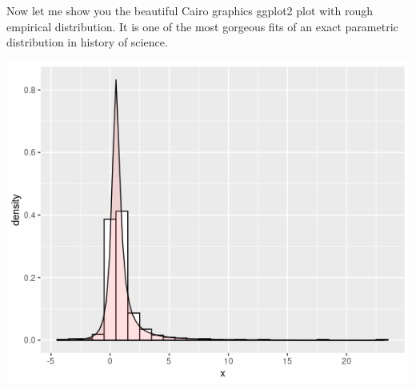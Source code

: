 \documentclass{amsart}
\begin{document}
Now let me show you the beautiful Cairo graphics ggplot2 plot with rough empirical distribution.  It is one of the most gorgeous fits of an exact parametric distribution in history of science.

\includegraphics[scale=1.0]{wveig.png}
\end{document}
